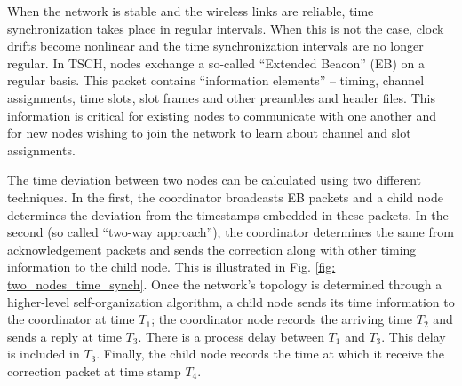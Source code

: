 When the network is stable and the wireless links are reliable, time synchronization takes place in regular intervals. When this is not the case, clock drifts become nonlinear and the time synchronization intervals are no longer regular. In TSCH, nodes exchange a so-called ``Extended Beacon'' (EB) on a regular basis. This packet contains ``information elements'' -- timing, channel assignments, time slots, slot frames and other preambles and header files. This information is critical for existing nodes to communicate with one another and for new nodes wishing to join the network to learn about channel and slot assignments. 

The time deviation between two nodes can be calculated using two different techniques. In the first, the coordinator broadcasts EB packets and a child node determines the  deviation from the timestamps embedded in these packets. In the second (so called ``two-way approach''), the coordinator determines the same from acknowledgement packets and sends the correction along with other timing information to the child  node. This is illustrated in Fig. \ref{fig: two_nodes_time_synch}. Once the network's topology is determined through a higher-level self-organization algorithm, a child node sends its time information to the coordinator at time $T_{1}$; the coordinator node records the arriving time $T_{2}$ and sends a reply  at time $T_{3}$. There is a process delay between  $T_{1}$ and  $T_{3}$. This delay is included in $T_{3}$.  Finally, the child node records the time at which it receive the correction packet at time stamp $T_{4}$. 

